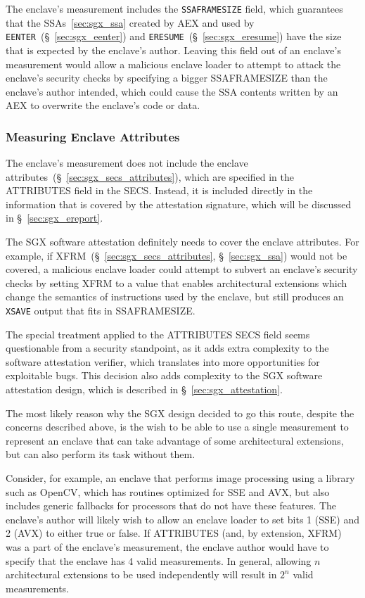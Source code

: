 The enclave's measurement includes the \texttt{SSAFRAMESIZE} field, which
guarantees that the SSAs~\ref{sec:sgx_ssa} created by AEX and used by
\texttt{EENTER}~(\S~\ref{sec:sgx_eenter}) and
\texttt{ERESUME}~(\S~\ref{sec:sgx_eresume}) have the size that is expected by
the enclave's author. Leaving this field out of an enclave's measurement would
allow a malicious enclave loader to attempt to attack the enclave's security
checks by specifying a bigger SSAFRAMESIZE than the enclave's author intended,
which could cause the SSA contents written by an AEX to overwrite the enclave's
code or data.

\subsubsection{Measuring Enclave Attributes}
\label{sec:sgx_ecreate_mrenclave_no_attributes}

The enclave's measurement does not include the enclave
attributes~(\S~\ref{sec:sgx_secs_attributes}), which are specified in the
ATTRIBUTES field in the SECS. Instead, it is included directly in the
information that is covered by the attestation signature, which will be
discussed in \S~\ref{sec:sgx_ereport}.

The SGX software attestation definitely needs to cover the enclave attributes.
For example, if XFRM~(\S~\ref{sec:sgx_secs_attributes}, \S~\ref{sec:sgx_ssa})
would not be covered, a malicious enclave loader could attempt to subvert an
enclave's security checks by setting XFRM to a value that enables architectural
extensions which change the semantics of instructions used by the enclave, but
still produces an \texttt{XSAVE} output that fits in SSAFRAMESIZE.

The special treatment applied to the ATTRIBUTES SECS field seems questionable
from a security standpoint, as it adds extra complexity to the software
attestation verifier, which translates into more opportunities for exploitable
bugs. This decision also adds complexity to the SGX software attestation
design, which is described in \S~\ref{sec:sgx_attestation}.

The most likely reason why the SGX design decided to go this route, despite the
concerns described above, is the wish to be able to use a single measurement to
represent an enclave that can take advantage of some architectural extensions,
but can also perform its task without them.

Consider, for example, an enclave that performs image processing using a
library such as OpenCV, which has routines optimized for SSE and AVX, but also
includes generic fallbacks for processors that do not have these features. The
enclave's author will likely wish to allow an enclave loader to set bits 1
(SSE) and 2 (AVX) to either true or false. If ATTRIBUTES (and, by extension,
XFRM) was a part of the enclave's measurement, the enclave author would have to
specify that the enclave has 4 valid measurements. In general, allowing $n$
architectural extensions to be used independently will result in $2^n$ valid
measurements.


